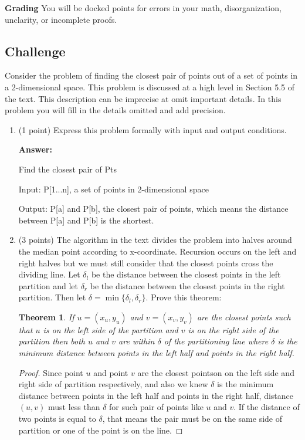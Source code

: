 \documentclass[paper=a4, fontsize=11pt]{scrartcl}
\newtheorem{theorem}{Theorem}
\numberwithin{equation}{section}		%
\numberwithin{figure}{section}			%
\numberwithin{table}{section}				%
\begin{document}
\noindent\textbf{Grading} You will be docked points for errors in your math, disorganization, unclarity, or incomplete proofs. 

\subsection{Challenge}

Consider the problem of finding the closest pair of points out of a set of points in a 2-dimensional space.  This problem is discussed at a high level in Section 5.5 of the text.  This description can be imprecise at omit important details.  In this problem you will fill in the details omitted and add precision.


\begin{enumerate}
\item (1 point) Express this problem formally with input and output conditions.

\textbf{Answer:}

Find the closest pair of Pts

Input: P[1...n], a set of points in 2-dimensional space

Output: P[a] and P[b], the closest pair of points, which means the distance between P[a] and P[b] is the shortest.


\item (3 points) The algorithm in the text divides the problem into halves around the median point according to x-coordinate.  Recursion occurs on the left and right halves but we must still consider that the closest points cross the dividing line.  Let $\delta_l$ be the distance between the closest points in the left partition and let $\delta_r$ be the distance between the closest points in the right partition.  Then let $\delta=\min\{\delta_l, \delta_r\}$.  Prove this theorem:
\begin{theorem}
If $u = (x_u, y_u)$ and $v = (x_v, y_v)$ are the closest points such that $u$ is on the left side of the partition and $v$ is on the right side of the partition then both $u$ and $v$ are within $\delta$ of the partitioning line where $\delta$ is the minimum distance between points in the left half and points in the right half.
\end{theorem}
\begin{proof}
	Since point $u$ and point $v$ are the closest pointson on the left side and right side of partition respectively, and also we knew $\delta$ is the minimum distance between points in the left half and points in the right half, distance$(u,v)$ must less than $\delta$ for such pair of points like $u$ and $v$. If the distance of two points is equal to $\delta$, that means the pair must be on the same side of partition or one of the point is on the line. 
\end{proof}





\end{enumerate}
\end{document}
